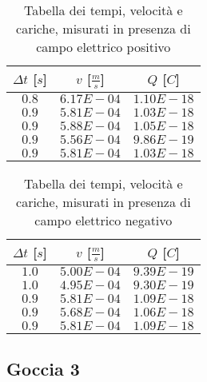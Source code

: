 \documentclass{article}
\begin{document}
\begin{multicols}{2}

\begin{table}[H]
	\centering
	\begin{tabular}{| c | c | c |}
		\hline
		$\Delta t$ [$s$] & $v$ [$\frac ms$] & $Q$ [$C$] \\
		\hline
		$0.8$ & $6.17E-04$ & $1.10E-18$ \\
		$0.9$ & $5.81E-04$ & $1.03E-18$ \\
		$0.9$ & $5.88E-04$ & $1.05E-18$ \\
		$0.9$ & $5.56E-04$ & $9.86E-19$ \\
		$0.9$ & $5.81E-04$ & $1.03E-18$ \\
		\hline
	\end{tabular}
	\caption{Tabella dei tempi, velocità e cariche, misurati in presenza di campo elettrico positivo}
	\label{}
\end{table}

\columnbreak

\begin{table}[H]
	\centering
	\begin{tabular}{| c | c | c |}
		\hline
		$\Delta t$ [$s$] & $v$ [$\frac ms$] & $Q$ [$C$] \\
		\hline
		$1.0$ & $5.00E-04$ & $9.39E-19$ \\
		$1.0$ & $4.95E-04$ & $9.30E-19$ \\
		$0.9$ & $5.81E-04$ & $1.09E-18$ \\
		$0.9$ & $5.68E-04$ & $1.06E-18$ \\
		$0.9$ & $5.81E-04$ & $1.09E-18$ \\
		\hline		
	\end{tabular}
	\caption{Tabella dei tempi, velocità e cariche, misurati in presenza di campo elettrico negativo}
	\label{}
\end{table}
	
\end{multicols}

\subsection{Goccia 3}
\end{document}
